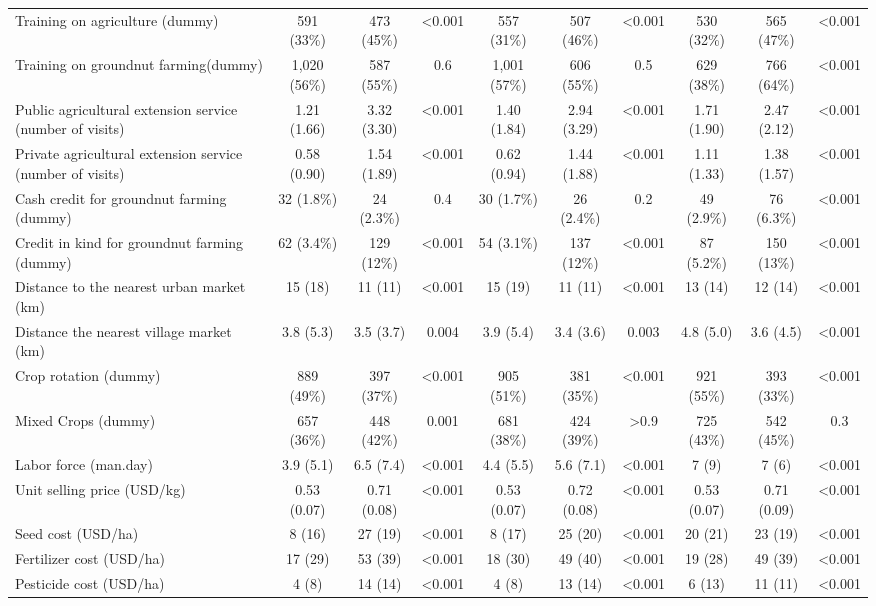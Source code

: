 \documentclass[
]{article}
\begin{document}
\begin{landscape}
\begin{table}[!h]
{\begin{threeparttable}
\begin{tabular}[t]{lccccccccc}
\addlinespace
Training on agriculture (dummy) & 591 (33\%) & 473 (45\%) & <0.001 & 557 (31\%) & 507 (46\%) & <0.001 & 530 (32\%) & 565 (47\%) & <0.001\\
Training on groundnut farming(dummy) & 1,020 (56\%) & 587 (55\%) & 0.6 & 1,001 (57\%) & 606 (55\%) & 0.5 & 629 (38\%) & 766 (64\%) & <0.001\\
Public agricultural extension service (number of visits) & 1.21 (1.66) & 3.32 (3.30) & <0.001 & 1.40 (1.84) & 2.94 (3.29) & <0.001 & 1.71 (1.90) & 2.47 (2.12) & <0.001\\
Private agricultural extension service (number of visits) & 0.58 (0.90) & 1.54 (1.89) & <0.001 & 0.62 (0.94) & 1.44 (1.88) & <0.001 & 1.11 (1.33) & 1.38 (1.57) & <0.001\\
Cash credit for groundnut farming (dummy) & 32 (1.8\%) & 24 (2.3\%) & 0.4 & 30 (1.7\%) & 26 (2.4\%) & 0.2 & 49 (2.9\%) & 76 (6.3\%) & <0.001\\
\addlinespace
Credit in kind for groundnut farming (dummy) & 62 (3.4\%) & 129 (12\%) & <0.001 & 54 (3.1\%) & 137 (12\%) & <0.001 & 87 (5.2\%) & 150 (13\%) & <0.001\\
Distance to the nearest urban market (km) & 15 (18) & 11 (11) & <0.001 & 15 (19) & 11 (11) & <0.001 & 13 (14) & 12 (14) & <0.001\\
Distance the nearest village market (km) & 3.8 (5.3) & 3.5 (3.7) & 0.004 & 3.9 (5.4) & 3.4 (3.6) & 0.003 & 4.8 (5.0) & 3.6 (4.5) & <0.001\\
Crop rotation (dummy) & 889 (49\%) & 397 (37\%) & <0.001 & 905 (51\%) & 381 (35\%) & <0.001 & 921 (55\%) & 393 (33\%) & <0.001\\
Mixed Crops (dummy) & 657 (36\%) & 448 (42\%) & 0.001 & 681 (38\%) & 424 (39\%) & >0.9 & 725 (43\%) & 542 (45\%) & 0.3\\
\addlinespace
Labor force (man.day) & 3.9 (5.1) & 6.5 (7.4) & <0.001 & 4.4 (5.5) & 5.6 (7.1) & <0.001 & 7 (9) & 7 (6) & <0.001\\
Unit selling price (USD/kg) & 0.53 (0.07) & 0.71 (0.08) & <0.001 & 0.53 (0.07) & 0.72 (0.08) & <0.001 & 0.53 (0.07) & 0.71 (0.09) & <0.001\\
Seed cost (USD/ha) & 8 (16) & 27 (19) & <0.001 & 8 (17) & 25 (20) & <0.001 & 20 (21) & 23 (19) & <0.001\\
Fertilizer cost (USD/ha) & 17 (29) & 53 (39) & <0.001 & 18 (30) & 49 (40) & <0.001 & 19 (28) & 49 (39) & <0.001\\
Pesticide cost (USD/ha) & 4 (8) & 14 (14) & <0.001 & 4 (8) & 13 (14) & <0.001 & 6 (13) & 11 (11) & <0.001\\

\end{tabular}
\end{threeparttable}}
\end{table}
\end{landscape}
\end{document}
